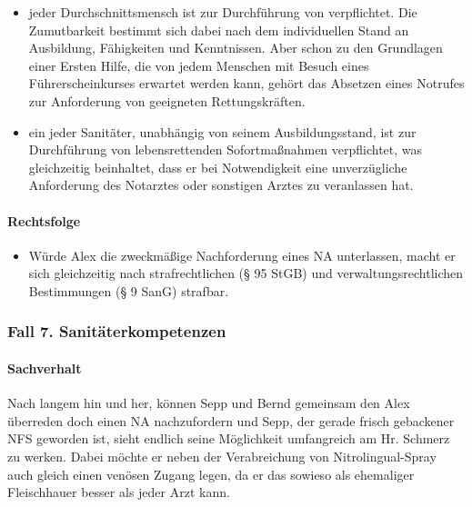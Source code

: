 \begin{itemize}
	\item {\mdseries
	jeder Durchschnittsmensch ist zur Durchf\"uhrung von
	 verpflichtet. Die
	Zumutbarkeit bestimmt sich dabei nach dem individuellen Stand an
	Ausbildung, Fähigkeiten und Kenntnissen. Aber schon zu den Grundlagen
	einer Ersten Hilfe, die von jedem Menschen mit Besuch eines
	F\"uhrerscheinkurses erwartet werden kann, geh\"ort das Absetzen eines
	Notrufes zur  Anforderung von geeigneten Rettungskräften.}

\end{itemize}


\begin{itemize}

	\item {\mdseries
	ein jeder Sanitäter, unabhängig von seinem Ausbildungsstand, ist zur
	Durchf\"uhrung von lebensrettenden Sofortma{\ss}nahmen verpflichtet,
	was gleichzeitig beinhaltet, dass er bei Notwendigkeit eine
	unverz\"ugliche Anforderung des Notarztes oder sonstigen Arztes zu
	veranlassen hat.}

\end{itemize}

\paragraph*{Rechtsfolge}

\begin{itemize}

	\item {\mdseries\color[rgb]{0.0,0.0,0.5019608}
	W\"urde Alex die zweckmä{\ss}ige Nachforderung eines NA unterlassen,
	macht er sich gleichzeitig nach strafrechtlichen ({\S} 95 StGB) und
	verwaltungsrechtlichen Bestimmungen ({\S} 9 SanG) strafbar.}

\end{itemize}

\subsubsection{Fall 7. Sanitäterkompetenzen}

\paragraph*{Sachverhalt}

Nach langem hin und her, k\"onnen Sepp und Bernd gemeinsam den Alex
\"uberreden doch einen NA nachzufordern und Sepp, der gerade frisch
gebackener NFS geworden ist, sieht endlich seine M\"oglichkeit
umfangreich am Hr. Schmerz zu werken. Dabei m\"ochte er neben der
Verabreichung von Nitrolingual-Spray auch gleich einen ven\"osen Zugang
legen, da er das sowieso als ehemaliger Fleischhauer besser als jeder
Arzt kann.

